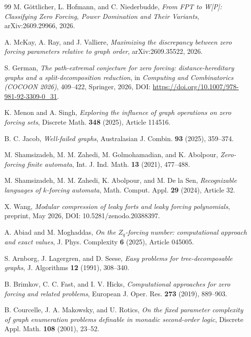 \documentclass[11pt,reqno]{amsart}
\theoremstyle{definition}
\begin{document}
\begin{thebibliography}{99}
M. G{\"o}ttlicher, L. Hofmann, and C. Niederbudde,
\emph{From FPT to W[P]: Classifying Zero Forcing, Power Domination and Their Variants},
arXiv:2609.29966, 2026.

A. McKay, A. Ray, and J. Valliere,
\emph{Maximizing the discrepancy between zero forcing parameters relative to graph order},
arXiv:2609.35522, 2026.

S. German,
\emph{The path-extremal conjecture for zero forcing: distance-hereditary graphs and a split-decomposition reduction},
in \emph{Computing and Combinatorics (COCOON 2026)}, 409--422,
Springer, 2026, DOI: \url{https://doi.org/10.1007/978-981-92-3309-0_31}.

K. Menon and A. Singh,
\emph{Exploring the influence of graph operations on zero forcing sets},
Discrete Math. \textbf{348} (2025), Article 114516.

B. C. Jacob,
\emph{Well-failed graphs},
Australasian J. Combin. \textbf{93} (2025), 359--374.

M. Shamsizadeh, M. M. Zahedi, M. Golmohamadian, and K. Abolpour,
\emph{Zero-forcing finite automata},
Int. J. Ind. Math. \textbf{13} (2021), 477--488.

M. Shamsizadeh, M. M. Zahedi, K. Abolpour, and M. De la Sen,
\emph{Recognizable languages of $k$-forcing automata},
Math. Comput. Appl. \textbf{29} (2024), Article 32.

X. Wang,
\emph{Modular compression of leaky forts and leaky forcing polynomials},
preprint, May 2026, DOI: 10.5281/zenodo.20388397.

A. Abiad and M. Moghaddas,
\emph{On the $Z_q$-forcing number: computational approach and exact values},
J. Phys. Complexity \textbf{6} (2025), Article 045005.

S. Arnborg, J. Lagergren, and D. Seese,
\emph{Easy problems for tree-decomposable graphs},
J. Algorithms \textbf{12} (1991), 308--340.

B. Brimkov, C. C. Fast, and I. V. Hicks,
\emph{Computational approaches for zero forcing and related problems},
European J. Oper. Res. \textbf{273} (2019), 889--903.

B. Courcelle, J. A. Makowsky, and U. Rotics,
\emph{On the fixed parameter complexity of graph enumeration problems definable in monadic second-order logic},
Discrete Appl. Math. \textbf{108} (2001), 23--52.


\end{thebibliography}
\end{document}
